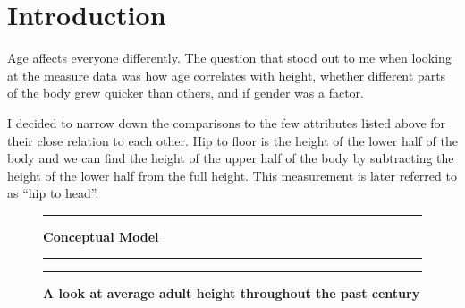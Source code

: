\documentclass[]{article}
\begin{document}
\noindent  

\section{Introduction}
\label{sec:intro}

Age affects everyone differently. The question that stood out to me when
looking at the measure data was how age correlates with height, whether
different parts of the body grew quicker than others, and if gender was
a factor.

I decided to narrow down the comparisons to the few attributes listed
above for their close relation to each other. Hip to floor is the height
of the lower half of the body and we can find the height of the upper
half of the body by subtracting the height of the lower half from the
full height. This measurement is later referred to as ``hip to head''.

\begin{figure}[!ht]
    \hrule
    \caption{ \textbf{Conceptual Model} }
    \begin{center}
    \end{center}
    \label{fig:conceptual-model}
  \hrule
  \vspace{2.5mm}
      \caption{\textbf{ A look at average adult height throughout the past century }   }
      \label{fig:combined}
  \vspace{-2.5mm}
  \hrule
\end{figure}
\newpage
\end{document}
